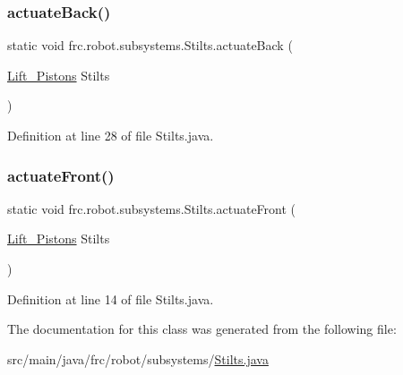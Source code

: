 \subsubsection{\texorpdfstring{actuate\+Back()}{actuateBack()}}
{\footnotesize\ttfamily static void frc.\+robot.\+subsystems.\+Stilts.\+actuate\+Back (\begin{DoxyParamCaption}\item[{\hyperlink{enumfrc_1_1robot_1_1_enums_1_1_lift___pistons}{Lift\+\_\+\+Pistons}}]{Stilts }\end{DoxyParamCaption})\hspace{0.3cm}{\ttfamily [static]}}



Definition at line 28 of file Stilts.\+java.

\mbox{\label{classfrc_1_1robot_1_1subsystems_1_1_stilts_af50dae1fe4775c73cefb856685f1e99a}} 
\subsubsection{\texorpdfstring{actuate\+Front()}{actuateFront()}}
{\footnotesize\ttfamily static void frc.\+robot.\+subsystems.\+Stilts.\+actuate\+Front (\begin{DoxyParamCaption}\item[{\hyperlink{enumfrc_1_1robot_1_1_enums_1_1_lift___pistons}{Lift\+\_\+\+Pistons}}]{Stilts }\end{DoxyParamCaption})\hspace{0.3cm}{\ttfamily [static]}}



Definition at line 14 of file Stilts.\+java.



The documentation for this class was generated from the following file\+:\begin{DoxyCompactItemize}
\item 
src/main/java/frc/robot/subsystems/\hyperlink{_stilts_8java}{Stilts.\+java}\end{DoxyCompactItemize}
